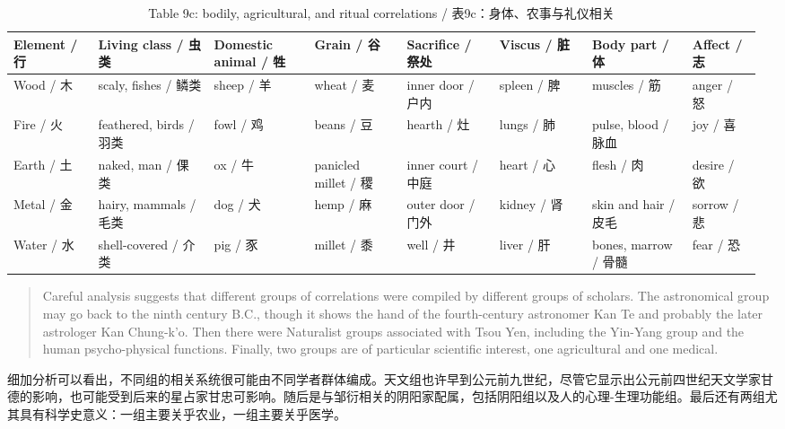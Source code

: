 \documentclass[UTF8,zihao=-4]{ctexart}
\newenvironment{enblock}
  {\par\smallskip\noindent{\scriptsize\bfseries English}\par\begin{quote}\small}
  {\end{quote}}
\newenvironment{zhblock}
  {\par\noindent{\scriptsize\bfseries 中文}\par}
  {\par\medskip}
\begin{document}
\begin{longtable}{>{\raggedright\arraybackslash}p{0.11\linewidth}
                  >{\raggedright\arraybackslash}p{0.15\linewidth}
                  >{\raggedright\arraybackslash}p{0.13\linewidth}
                  >{\raggedright\arraybackslash}p{0.12\linewidth}
                  >{\raggedright\arraybackslash}p{0.12\linewidth}
                  >{\raggedright\arraybackslash}p{0.12\linewidth}
                  >{\raggedright\arraybackslash}p{0.13\linewidth}
                  >{\raggedright\arraybackslash}p{0.09\linewidth}}
\caption{Table 9c: bodily, agricultural, and ritual correlations / 表9c：身体、农事与礼仪相关}\\
\toprule
Element / 行 & Living class / 虫类 & Domestic animal / 牲 & Grain / 谷 & Sacrifice / 祭处 & Viscus / 脏 & Body part / 体 & Affect / 志\\
\midrule
Wood / 木 & scaly, fishes / 鳞类 & sheep / 羊 & wheat / 麦 & inner door / 户内 & spleen / 脾 & muscles / 筋 & anger / 怒\\
Fire / 火 & feathered, birds / 羽类 & fowl / 鸡 & beans / 豆 & hearth / 灶 & lungs / 肺 & pulse, blood / 脉血 & joy / 喜\\
Earth / 土 & naked, man / 倮类 & ox / 牛 & panicled millet / 稷 & inner court / 中庭 & heart / 心 & flesh / 肉 & desire / 欲\\
Metal / 金 & hairy, mammals / 毛类 & dog / 犬 & hemp / 麻 & outer door / 门外 & kidney / 肾 & skin and hair / 皮毛 & sorrow / 悲\\
Water / 水 & shell-covered / 介类 & pig / 豕 & millet / 黍 & well / 井 & liver / 肝 & bones, marrow / 骨髓 & fear / 恐\\
\bottomrule
\end{longtable}

\begin{enblock}
Careful analysis suggests that different groups of correlations were compiled by different groups of scholars. The astronomical group may go back to the ninth century B.C., though it shows the hand of the fourth-century astronomer Kan Te and probably the later astrologer Kan Chung-k'o. Then there were Naturalist groups associated with Tsou Yen, including the Yin-Yang group and the human psycho-physical functions. Finally, two groups are of particular scientific interest, one agricultural and one medical.
\end{enblock}
\begin{zhblock}
细加分析可以看出，不同组的相关系统很可能由不同学者群体编成。天文组也许早到公元前九世纪，尽管它显示出公元前四世纪天文学家甘德的影响，也可能受到后来的星占家甘忠可影响。随后是与邹衍相关的阴阳家配属，包括阴阳组以及人的心理-生理功能组。最后还有两组尤其具有科学史意义：一组主要关乎农业，一组主要关乎医学。
\end{zhblock}
\end{document}
